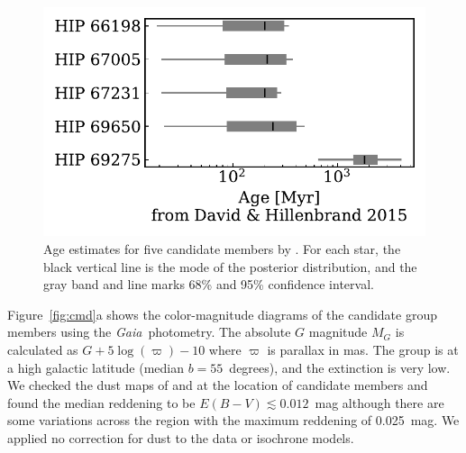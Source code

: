 \documentclass[modern,letterpaper]{aastex61}
\newcommand{\project}[1]{\textsl{#1}}
\newcommand{\gaia}{\project{Gaia}}
\begin{document}
\begin{figure}
  \centering
  \includegraphics{age_DavidHillenbrand2015.pdf}
  \caption{Age estimates for five candidate members by \citet{2015ApJ...804..146D}.
    For each star, the black vertical line is the mode of the posterior
    distribution, and the gray band and line marks 68\% and 95\% confidence
    interval.
  }
  \label{fig:age_DavidHillenbrand2015}
\end{figure}

Figure~\ref{fig:cmd}a shows the color-magnitude diagrams
of the candidate group members using the \gaia\ photometry.
The absolute $G$ magnitude $M_G$ is calculated as $G + 5\log(\varpi) -10$ where
$\varpi$ is parallax in mas.
The group is at a high galactic latitude (median $b=55$~degrees),
and the extinction is very low.
We checked the dust maps of \citet{1998ApJ...500..525S} and
\citet{2017ApJ...846...38L}
at the location of candidate members and found the median reddening to be
$E(B-V)\lesssim 0.012$~mag although there are some variations across the region with
the maximum reddening of 0.025~mag.
We applied no correction for dust to the data or isochrone models.
\end{document}
